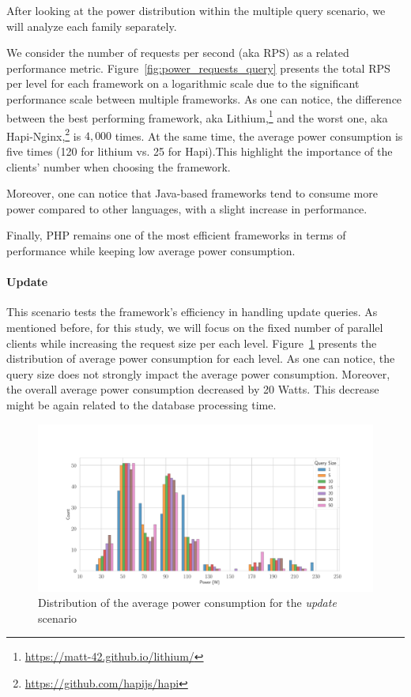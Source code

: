 After looking at the power distribution within the multiple query scenario, we will analyze each family separately.

We consider the number of requests per second (aka RPS) as a related performance metric.
Figure~\ref{fig:power_requests_query} presents the total RPS per level for each framework on a logarithmic scale due to the significant performance scale between multiple frameworks.
As one can notice, the difference between the best performing framework, aka Lithium,\footnote{\url{https://matt-42.github.io/lithium/}} and the worst one, aka Hapi-Nginx,\footnote{\url{https://github.com/hapijs/hapi}} is $4,000$ times. At the same time, the average power consumption is five times (120 for lithium vs. 25 for Hapi).This highlight the importance of the clients' number when choosing the framework.

Moreover, one can notice that Java-based frameworks tend to consume more power compared to other languages, with a slight increase in performance.

Finally, PHP remains one of the most efficient frameworks in terms of performance while keeping low average power consumption.



\paragraph{Update}

This scenario tests the framework's efficiency in handling update queries.
As mentioned before, for this study, we will focus on the fixed number of parallel clients while increasing the request size per each level.
Figure~\ref{fig:av_power_update} presents the distribution of average power consumption for each level.
As one can notice, the query size does not strongly impact the average power consumption.
Moreover, the overall average power consumption decreased by 20 Watts. This decrease might be again related to the database processing time.

\begin{figure}[!h]
    \centering
    \includegraphics[width=\textwidth,height=\textheight,keepaspectratio]{imgs/histogram_av_power_cpu_update}
    \caption{Distribution of the average power consumption for the \emph{update} scenario}
    \label{fig:av_power_update}
\end{figure}

